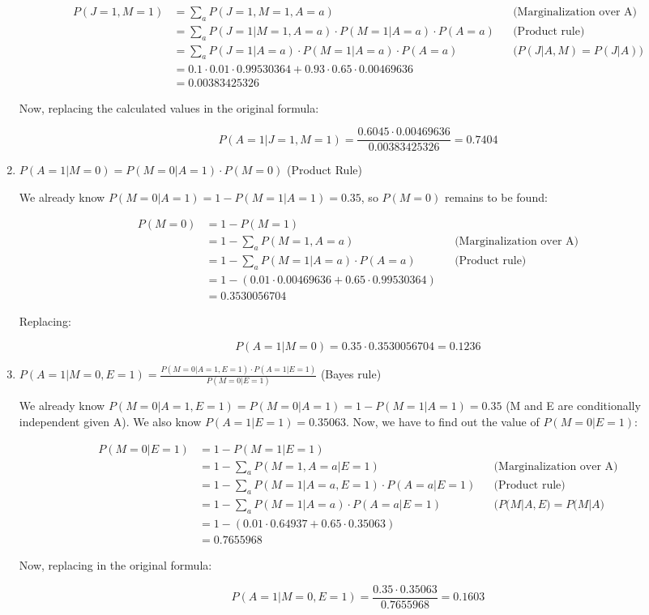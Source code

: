 \documentclass{article}
\begin{document}
\begin{enumerate}[label=(\alph*)]
\begin{align*}
P(J=1,M=1) & =\sum_{a}P(J=1,M=1,A=a) && \text{(Marginalization over A)}\\
& = \sum_{a}P(J=1|M=1,A=a) \cdot P(M=1|A=a) \cdot P(A=a) && \text{(Product rule)}\\
& = \sum_{a}P(J=1|A=a) \cdot P(M=1|A=a) \cdot P(A=a) && \text{($P(J|A,M)=P(J|A)$)}\\
& = 0.1 \cdot 0.01 \cdot 0.99530364 + 0.93 \cdot 0.65 \cdot 0.00469636\\
& = 0.00383425326
\end{align*}

Now, replacing the calculated values in the original formula:

$$P(A=1|J=1,M=1) = \frac{0.6045 \cdot 0.00469636}{0.00383425326} = 0.7404 $$

\item
$P(A=1|M=0)=P(M=0|A=1) \cdot P(M=0)$ (Product Rule)

We already know $P(M=0|A=1) = 1 - P(M=1|A=1) = 0.35$, so $P(M=0)$ remains to be found:

\begin{align*}
P(M=0) & =1-P(M=1)\\
& =1-\sum_{a}P(M=1,A=a) && \text{(Marginalization over A)}\\
& =1-\sum_{a}P(M=1|A=a) \cdot P(A=a) && \text{(Product rule)}\\
& = 1-(0.01 \cdot 0.00469636 + 0.65 \cdot 0.99530364)\\
& = 0.3530056704
\end{align*}

Replacing:

$$P(A=1|M=0)=0.35 \cdot 0.3530056704 = 0.1236$$

\item
$P(A=1|M=0,E=1)=\frac{P(M=0|A=1,E=1) \cdot P(A=1|E=1)}{P(M=0|E=1)}$ (Bayes rule)

We already know $P(M=0|A=1,E=1)=P(M=0|A=1)=1-P(M=1|A=1)=0.35$ (M and E are conditionally independent given A).
We also know $P(A=1|E=1)=0.35063$. Now, we have to find out the value of $P(M=0|E=1)$:

\begin{align*}
P(M=0|E=1) & =1-P(M=1|E=1)\\
& =1-\sum_{a}P(M=1,A=a|E=1) && \text{(Marginalization over A)}\\
& =1-\sum_{a}P(M=1|A=a,E=1) \cdot P(A=a|E=1) && \text{(Product rule)}\\
& =1-\sum_{a}P(M=1|A=a) \cdot P(A=a|E=1) && \text{($P(M|A,E)=P(M|A$)}\\
& = 1-(0.01 \cdot 0.64937 + 0.65 \cdot 0.35063)\\
& = 0.7655968
\end{align*}

Now, replacing in the original formula:

$$P(A=1|M=0,E=1)=\frac{0.35 \cdot 0.35063}{0.7655968}=0.1603$$
\end{enumerate}
\end{document}
